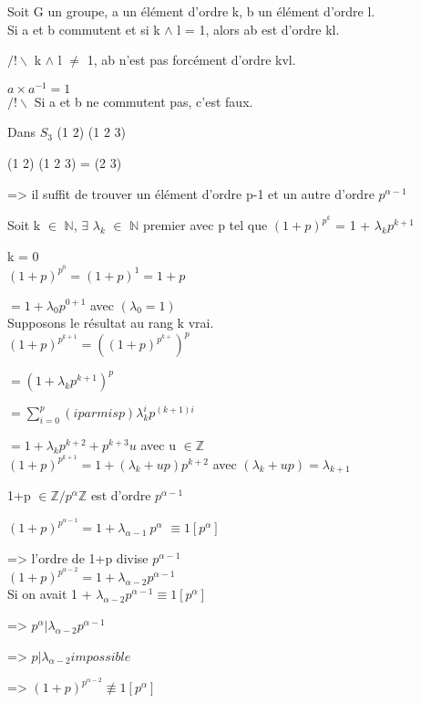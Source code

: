 \begin{prop}
	Soit G un groupe, a un élément d'ordre k, b un élément d'ordre l.\\
	Si a et b commutent et si k $\wedge$ l = 1, alors ab est d'ordre kl.
	
	$/!\backslash$ k $\wedge$ l $\not=$ 1, ab n'est pas forcément d'ordre kvl.
	
	$a \times a^{-1} =1$\\
	$/!\backslash$ Si a et b ne commutent pas, c'est faux.
	
		Dans $S_{3}$ (1 2) (1 2 3)
		
		(1 2) (1 2 3) = (2 3)
		
	=> il suffit de trouver un élément d'ordre p-1 et un autre d'ordre $p^{\alpha -1}$
\end{prop}
\begin{lem}
	Soit k $\in$ $\mathbb{N}$, $\exists$ $\lambda_{k}$ $\in$ $\mathbb{N}$ premier avec p tel que $(1+p)^{p^{k}}$ = 1 + $\lambda_{k}p^{k+1}$
\end{lem}
\begin{dem}
	k = 0\\
	$(1+p)^{p^{0}} = (1+p)^{1} = 1+p $
	
	$= 1+\lambda_{0} p^{0+1}$ avec $(\lambda_{0} = 1)$
	\\\newline
	Supposons le résultat au rang k vrai.\\
	$(1+p)^{p^{k+1}} =  ((1+p)^{p^{k+}})^{p}$
	
	$= (1+\lambda_{k}p^{k+1})^{p}$
	
	$= \sum_{i=0}^{p} (i parmis p) \lambda_{k}^{i} p^{(k+1)i}$
	
	$= 1 + \lambda_{k}p^{k+2} + p^{k+3} u$ avec u $\in \mathbb{Z}$\\
	$(1+p)^{p^{k+1}} = 1 + (\lambda_{k} + up)p^{k+2}$ avec $ (\lambda_{k} + up) = \lambda_{k+1}$
\end{dem}
\begin{cor}
	1+p $\in \mathbb{Z}/p^{\alpha}\mathbb{Z}$ est d'ordre $p^{\alpha-1}$
\end{cor}
\begin{dem}
	$(1+p)^{p^{\alpha -1}} = 1 + \lambda_{\alpha-1}\ p^{\alpha}$ $\equiv 1[p^{\alpha}]$
	
	=> l'ordre de 1+p divise $p^{\alpha-1}$\\
	$(1+p)^{p^{\alpha -2}} = 1 + \lambda_{\alpha-2}p^{\alpha-1}$\\
	Si on avait 1 + $\lambda_{\alpha-2} p^{\alpha-1} \equiv 1[p^{\alpha}]$
	
	=> $p^{\alpha} | \lambda_{\alpha -2} p^{\alpha-1}$
	
	=> $p | \lambda_{\alpha -2} impossible$
	
	=> $(1+p)^{p^{\alpha-2}}\not\equiv 1[p^{\alpha}]$
\end{dem}
